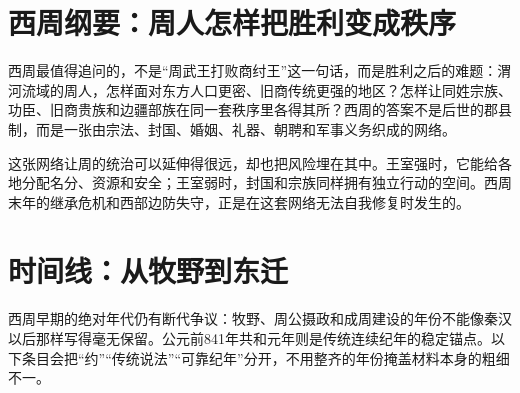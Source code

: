 \section{西周纲要：周人怎样把胜利变成秩序}

西周最值得追问的，不是“周武王打败商纣王”这一句话，而是胜利之后的难题：渭河流域的周人，怎样面对东方人口更密、旧商传统更强的地区？怎样让同姓宗族、功臣、旧商贵族和边疆部族在同一套秩序里各得其所？西周的答案不是后世的郡县制，而是一张由宗法、封国、婚姻、礼器、朝聘和军事义务织成的网络。

这张网络让周的统治可以延伸得很远，却也把风险埋在其中。王室强时，它能给各地分配名分、资源和安全；王室弱时，封国和宗族同样拥有独立行动的空间。西周末年的继承危机和西部边防失守，正是在这套网络无法自我修复时发生的。

\section{时间线：从牧野到东迁}
\begin{center}
\end{center}

\begin{sourcenote}[这条时间线有多可靠]
西周早期的绝对年代仍有断代争议：牧野、周公摄政和成周建设的年份不能像秦汉以后那样写得毫无保留。公元前841年共和元年则是传统连续纪年的稳定锚点。以下条目会把“约”“传统说法”“可靠纪年”分开，不用整齐的年份掩盖材料本身的粗细不一。
\end{sourcenote}
